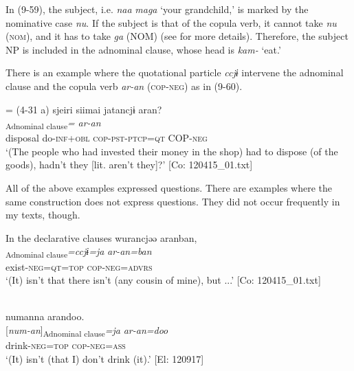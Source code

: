 In (9-59), the subject, i.e. \textit{naa} \textit{maga} ‘your grandchild,’ is marked by the nominative case \textit{nu}. If the subject is that of the copula verb, it cannot take \textit{nu} (\textsc{nom}), and it has to take \textit{ga} (NOM) (see  for more details). Therefore, the subject NP is included in the adnominal clause, whose head is \textit{kam-} ‘eat.’

There is an example where the quotational particle \textit{ccjɨ} intervene the adnominal clause and the copula verb \textit{ar-an} (\textsc{cop}-\textsc{neg}) as in (9-60).

\ea{} = (4-31 a) \label{ex:9.60}
 \glll  {\textbar}sjeiri{\textbar}  siimai  jatancjɨ  aran?\\
    [\textit{sjeiri}  \textit{sɨr-i+mai}  \textit{jar-tar-n}]\textsubscript{Adnominal clause}\textit{=}  \textit{ar-an}\\
    disposal  do-\textsc{inf}+\textsc{obl}  \textsc{cop}-\textsc{pst}-\textsc{ptcp}=\textsc{qt}  COP-\textsc{neg}\\
    \glt     ‘(The people who had invested their money in the shop) had to dispose (of the goods), hadn’t they [lit. aren’t they]?’ [Co: 120415\_01.txt]
\z

  All of the above examples expressed questions. There are examples where the same construction does not express questions. They did not occur frequently in my texts, though.

\ea   In the declarative clauses \label{ex:9.61}
\ea %
\glll   wurancjəə  aranban,\\
      [\textit{wur-an}]\textsubscript{Adnominal clause}\textit{=ccjɨ=ja}  \textit{ar-an=ban}\\
      exist-\textsc{neg}=\textsc{qt}=\textsc{top}  \textsc{cop}-\textsc{neg}=\textsc{advrs}\\
      \glt       ‘(It) isn’t that there isn’t (any cousin of mine), but ...’ [Co: 120415\_01.txt]

\ex{}\\
    \glll  numanna  arandoo.\\
      {[\textit{num-an}]\textsubscript{Adnominal clause}\textit{=ja}}  \textit{ar-an=doo}\\
      drink-\textsc{neg}=\textsc{top}  \textsc{cop}-\textsc{neg}=\textsc{ass}\\
      \glt       ‘(It) isn’t (that I) don’t drink (it).’ [El: 120917]
    \z
\z

